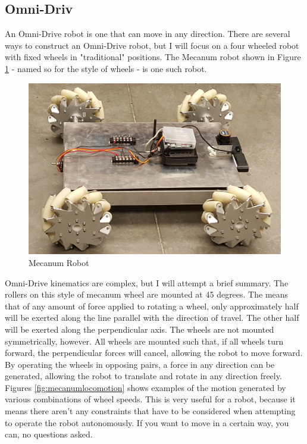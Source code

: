 \subsection{Omni-Driv}

An Omni-Drive robot is one that can move in any direction. There are several ways to construct an Omni-Drive robot, but I will focus on a four wheeled robot with fixed wheels in "traditional" positions. The Mecanum robot shown in Figure \ref{fig:mecanumrobot} - named so for the style of wheels - is one such robot.

\begin{figure}[h]
\centering
\includegraphics[width=.65\textwidth]{mecanumrobot.png}
\caption{Mecanum Robot}
\label{fig:mecanumrobot}
\end{figure} 


Omni-Drive kinematics are complex, but I will attempt a brief summary. The rollers on this style of mecanum wheel are mounted at 45 degrees. The means that of any amount of force applied to rotating a wheel, only approximately half will be exerted along the line parallel with the direction of travel. The other half will be exerted along the perpendicular axis. The wheels are not mounted symmetrically, however. All wheels are mounted such that, if all wheels turn forward, the perpendicular forces will cancel, allowing the robot to move forward. By operating the wheels in opposing pairs, a force in any direction can be generated, allowing the robot to translate and rotate in any direction freely. Figures \ref{fig:mecanumlocomotion} shows examples of the motion generated by various combinations of wheel speeds. This is very useful for a robot, because it means there aren't any constraints that have to be considered when attempting to operate the robot autonomously. If you want to move in a certain way, you can, no questions asked.


